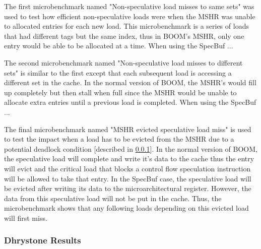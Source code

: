 The first microbenchmark named "Non-speculative load misses to same sets" was used to test how efficient non-speculative loads
were when the MSHR was unable to allocated entries for each new load. This microbenchmark is a series of loads that had different
tags but the same index, thus in BOOM's MSHR, only one entry would be able to be allocated at a time. When using the SpecBuf ...

The second microbenchmark named "Non-speculative load misses to different sets" is similar to the first except that each subsequent
load is accessing a different set in the cache. In the normal version of BOOM, the MSHR's would fill up completely but then stall 
when full since the MSHR would be unable to allocate extra entries until a previous load is completed. When using the SpecBuf ...

The final microbenchmark named "MSHR evicted speculative load miss" is used to test the impact when a load has to be evicted from the 
MSHR due to a potential deadlock condition [described in \ref{}]. In the normal version of BOOM, the speculative load will complete and
write it's data to the cache thus the entry will evict and the critical load that blocks a control flow speculation instruction will be
allowed to take that entry. In the SpecBuf case, the speculative load will be evicted after writing its data to the microarchitectural 
register. However, the data from this speculative load will not be put in the cache. Thus, the microbenchmark shows that any following
loads depending on this evicted load will first miss.

\subsubsection{Dhrystone Results}
